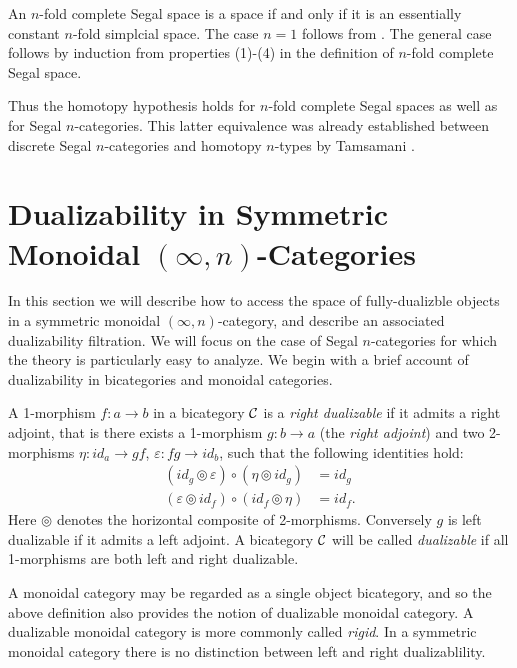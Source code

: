 \documentclass{amsart}
\begin{document}
\begin{example}
	An $n$-fold complete Segal space is a space if and only if it is an essentially constant $n$-fold simplcial space. The case $n=1$ follows from \cite{MR1804411}. The general case follows by induction from properties (1)-(4) in the definition of $n$-fold complete Segal space.
\end{example}

Thus the homotopy hypothesis holds for $n$-fold complete Segal spaces as well as for  Segal $n$-categories. This latter equivalence was already established between discrete Segal $n$-categories and homotopy $n$-types by Tamsamani \cite{Tamsamani:thesis}.



\section{Dualizability in Symmetric Monoidal $(\infty,n)$-Categories} \label{sec-duals}

In this section we will describe how to access the space of fully-dualizble objects in a symmetric monoidal $(\infty,n)$-category, and describe an associated dualizability filtration. We will focus on the case of Segal $n$-categories for which the theory is particularly easy to analyze. We begin with a brief account of dualizability in bicategories and monoidal categories. 

\begin{definition}
	A 1-morphism $f: a \to b$ in a bicategory $\mathcal C$ is a {\em right dualizable} if it admits a right adjoint, that is there exists a 1-morphism $g: b \to a$ (the {\em right adjoint}) and two 2-morphisms $\eta: id_a \to gf$, $\varepsilon: fg \to id_b$, such that the following identities hold: 
\begin{align*}
			(id_{g} \circledcirc \varepsilon  ) \circ (  \eta \circledcirc id_{g}) &= id_{g} \\
			(\varepsilon \circledcirc id_{f}) \circ (id_{f} \circledcirc \eta) &= id_{f}.
		\end{align*}
	Here $\circledcirc$ denotes the horizontal composite of 2-morphisms. Conversely $g$ is left dualizable if it  admits a left adjoint. A bicategory $\mathcal C$ will be called {\em dualizable} if all 1-morphisms are both left and right dualizable.  
\end{definition} 

A monoidal category may be regarded as a single object bicategory, and so the above definition also provides the notion of dualizable monoidal category.  A dualizable monoidal category is more commonly called {\em rigid}. In a symmetric monoidal category there is no distinction between left and right dualizablility. 
\end{document}
